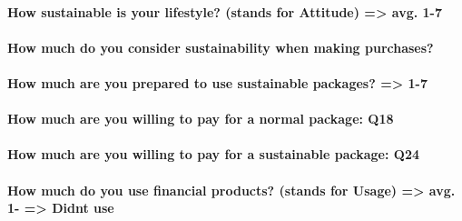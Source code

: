 \documentclass[
]{article}
\begin{document}
\hypertarget{how-sustainable-is-your-lifestyle-stands-for-attitude-avg.-1-7}{%
\paragraph{How sustainable is your lifestyle? (stands for Attitude)
=\textgreater{} avg.
1-7}\label{how-sustainable-is-your-lifestyle-stands-for-attitude-avg.-1-7}}

\hypertarget{how-much-do-you-consider-sustainability-when-making-purchases}{%
\paragraph{How much do you consider sustainability when making
purchases?}\label{how-much-do-you-consider-sustainability-when-making-purchases}}

\hypertarget{how-much-are-you-prepared-to-use-sustainable-packages-1-7}{%
\paragraph{How much are you prepared to use sustainable packages?
=\textgreater{}
1-7}\label{how-much-are-you-prepared-to-use-sustainable-packages-1-7}}

\hypertarget{how-much-are-you-willing-to-pay-for-a-normal-package-q18}{%
\paragraph{How much are you willing to pay for a normal package:
Q18}\label{how-much-are-you-willing-to-pay-for-a-normal-package-q18}}

\hypertarget{how-much-are-you-willing-to-pay-for-a-sustainable-package-q24}{%
\paragraph{How much are you willing to pay for a sustainable package:
Q24}\label{how-much-are-you-willing-to-pay-for-a-sustainable-package-q24}}

\hypertarget{how-much-do-you-use-financial-products-stands-for-usage-avg.-1--didnt-use}{%
\paragraph{How much do you use financial products? (stands for Usage)
=\textgreater{} avg. 1- =\textgreater{} Didnt
use}\label{how-much-do-you-use-financial-products-stands-for-usage-avg.-1--didnt-use}}
\end{document}
